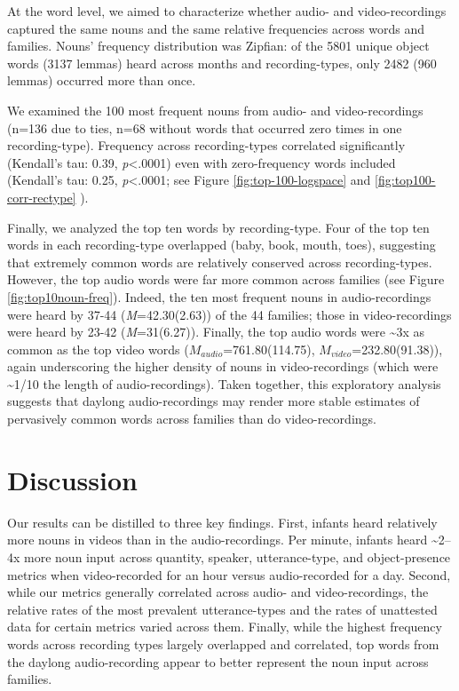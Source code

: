 \documentclass[man]{apa6}
\theoremstyle{definition}
\theoremstyle{definition}
\theoremstyle{definition}
\theoremstyle{remark}
\begin{document}
At the word level, we aimed to characterize whether audio- and
video-recordings captured the same nouns and the same relative
frequencies across words and families. Nouns' frequency distribution was
Zipfian: of the 5801 unique object words (3137 lemmas) heard across
months and recording-types, only 2482 (960 lemmas) occurred more than
once.

We examined the 100 most frequent nouns from audio- and video-recordings
(n=136 due to ties, n=68 without words that occurred zero times in one
recording-type). Frequency across recording-types correlated
significantly (Kendall's tau: 0.39, \emph{p}\textless{}.0001) even with
zero-frequency words included (Kendall's tau: 0.25,
\emph{p}\textless{}.0001; see Figure \ref{fig:top-100-logspace} and
\ref{fig:top100-corr-rectype} ).

Finally, we analyzed the top ten words by recording-type. Four of the
top ten words in each recording-type overlapped (baby, book, mouth,
toes), suggesting that extremely common words are relatively conserved
across recording-types. However, the top audio words were far more
common across families (see Figure \ref{fig:top10noun-freq}). Indeed,
the ten most frequent nouns in audio-recordings were heard by 37-44
(\emph{M}=42.30(2.63)) of the 44 families; those in video-recordings
were heard by 23-42 (\emph{M}=31(6.27)). Finally, the top audio words
were \textasciitilde{}3x as common as the top video words
(\(M_{audio}\)=761.80(114.75), \(M_{video}\)=232.80(91.38)), again
underscoring the higher density of nouns in video-recordings (which were
\textasciitilde{}1/10 the length of audio-recordings). Taken together,
this exploratory analysis suggests that daylong audio-recordings may
render more stable estimates of pervasively common words across families
than do video-recordings.

\section{Discussion}\label{discussion}

Our results can be distilled to three key findings. First, infants heard
relatively more nouns in videos than in the audio-recordings. Per
minute, infants heard \textasciitilde{}2--4x more noun input across
quantity, speaker, utterance-type, and object-presence metrics when
video-recorded for an hour versus audio-recorded for a day. Second,
while our metrics generally correlated across audio- and
video-recordings, the relative rates of the most prevalent
utterance-types and the rates of unattested data for certain metrics
varied across them. Finally, while the highest frequency words across
recording types largely overlapped and correlated, top words from the
daylong audio-recording appear to better represent the noun input across
families.
\end{document}
